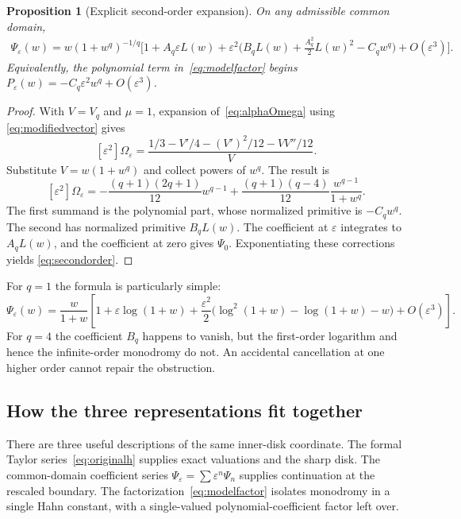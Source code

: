 \documentclass[11pt,a4paper]{article}
\numberwithin{equation}{section}
\newtheorem{proposition}[theorem]{Proposition}
\theoremstyle{definition}
\theoremstyle{remark}
\newcommand{\eps}{\varepsilon}
\begin{document}
\begin{proposition}[Explicit second-order expansion]
\label{prop:second}
On any admissible common domain,
\begin{equation}\label{eq:secondorder}
 \begin{split}
 \Psi_\eps(w)=w(1+w^q)^{-1/q}\biggl[1+A_q\eps L(w)
  +\eps^2\biggl(B_qL(w)+\frac{A_q^2}{2}L(w)^2-C_qw^q\biggr)
  +O(\eps^3)\biggr].
 \end{split}
\end{equation}
Equivalently, the polynomial term in~\eqref{eq:modelfactor} begins
$P_\eps(w)=-C_q\eps^2 w^q+O(\eps^3)$.
\end{proposition}

\begin{proof}
With $V=V_q$ and $\mu=1$, expansion of~\eqref{eq:alphaOmega} using
\eqref{eq:modifiedvector} gives
\[
 [\eps^2]\Omega_\eps
  =\frac{1/3-V'/4-(V')^2/12-VV''/12}{V}.
\]
Substitute $V=w(1+w^q)$ and collect powers of $w^q$.  The result is
\begin{equation}\label{eq:omega2model}
 [\eps^2]\Omega_\eps
  =-\frac{(q+1)(2q+1)}{12}w^{q-1}
   +\frac{(q+1)(q-4)}{12}\frac{w^{q-1}}{1+w^q}.
\end{equation}
The first summand is the polynomial part, whose normalized primitive is
$-C_qw^q$.  The second has normalized primitive $B_qL(w)$.
The coefficient at $\eps$ integrates to $A_qL(w)$, and the coefficient at
zero gives $\Psi_0$.  Exponentiating these corrections yields
\eqref{eq:secondorder}.
\end{proof}

For $q=1$ the formula is particularly simple:
\begin{equation}\label{eq:q1second}
 \Psi_\eps(w)=\frac{w}{1+w}
 \left[1+\eps\log(1+w)
 +\frac{\eps^2}{2}\bigl(\log^2(1+w)-\log(1+w)-w\bigr)
 +O(\eps^3)\right].
\end{equation}
For $q=4$ the coefficient $B_q$ happens to vanish, but the first-order
logarithm and hence the infinite-order monodromy do not.  An accidental
cancellation at one higher order cannot repair the obstruction.

\subsection{How the three representations fit together}

There are three useful descriptions of the same inner-disk coordinate.
The formal Taylor series~\eqref{eq:originalh} supplies exact valuations and
the sharp disk.  The common-domain coefficient series
$\Psi_\eps=\sum\eps^n\Psi_n$ supplies continuation at the rescaled boundary.
The factorization~\eqref{eq:modelfactor} isolates monodromy in a single Hahn
constant, with a single-valued polynomial-coefficient factor left over.
\end{document}

